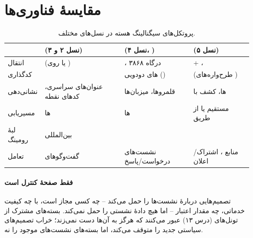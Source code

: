 \documentclass[11pt,a4paper]{article}
\begin{document}
\section{مقایسهٔ فناوری‌ها}
\begin{table}[htbp]
\centering\small
\caption{پروتکل‌های سیگنالینگ هسته در نسل‌های مختلف.}\label{tab:sig}
\begin{tabularx}{\linewidth}{@{}l Y Y Y@{}}
\toprule
{} &  (نسل ۲ و ۳) &  (نسل ۴، ) &  (نسل ۵) \\
\midrule
انتقال     &  (یا  روی ) & ، درگاه ۳۸۶۸ &  + ،  \\
کدگذاری    &                   & های دودویی () &  (طرح‌واره‌های ) \\
نشانی‌دهی  & عنوان‌های سراسری، کدهای نقطه  & قلمروها، میزبان‌ها & ها، کشف با  \\
مسیریابی   & ها                  & ها       & مستقیم یا از طریق  \\
لبهٔ رومینگ &  بین‌المللی         &          &  \\
تعامل      & گفت‌وگوهای         & نشست‌های درخواست/پاسخ & منابع ، اشتراک/اعلان \\
\bottomrule
\end{tabularx}
\end{table}

\paragraph{ فقط صفحهٔ کنترل است}  تصمیم‌هایی دربارهٔ نشست‌ها را حمل می‌کند -- چه کسی مجاز
است، با چه کیفیت خدماتی، چه مقدار اعتبار -- اما هیچ دادهٔ نشستی را حمل نمی‌کند. بسته‌های مشترک از تونل‌های
 (درس ۱۳) عبور می‌کنند که  هرگز به آن‌ها دست نمی‌زند؛  خراب تصمیم‌های سیاستی جدید را
متوقف می‌کند، اما بسته‌های نشست‌های موجود را نه.

\end{document}
